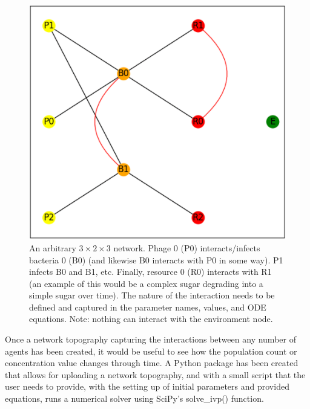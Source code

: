 \begin{figure}
    \centering
    \includegraphics[width=0.5\linewidth]{Screenshots/example_network.png}
    \caption{An arbitrary $3\times2\times3$ network. Phage 0 (P0) interacts/infects bacteria 0 (B0) (and likewise B0 interacts with P0 in some way). P1 infects B0 and B1, etc. Finally, resource 0 (R0) interacts with R1 (an example of this would be a complex sugar degrading into a simple sugar over time). The nature of the interaction needs to be defined and captured in the parameter names, values, and ODE equations. Note: nothing can interact with the environment node.}
    \label{fig:ss:example_network}
\end{figure}
 
Once a network topography capturing the interactions between any number of agents has been created, it would be useful to see how the population count or concentration value changes through time. 
A Python package has been created that allows for uploading a network topography, and with a small script that the user needs to provide, with the setting up of initial parameters and provided equations, runs a numerical solver using SciPy's solve\_ivp() function.  